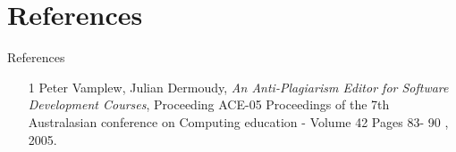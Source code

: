 \documentclass[color=usenames,dvipsnames]{beamer}
\begin{document}
\section{References}

\begin{frame}{References}

\begin{itemize}

  \setlength{\itemsep}{20pt}

\fontsize{.25cm}{1em}\selectfont

\item  [1]	Peter Vamplew, Julian Dermoudy, \emph{An Anti-Plagiarism Editor for Software Development Courses}, Proceeding ACE-05 Proceedings of the 7th
Australasian conference on Computing education - Volume 42 Pages 83-
90 , 2005.

\end{itemize}

\end{frame}
\end{document}
